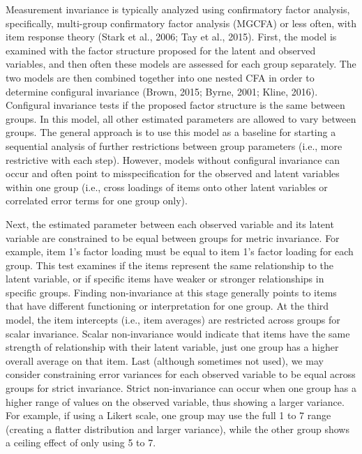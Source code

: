 \documentclass[
  man]{apa7}
\begin{document}
Measurement invariance is typically analyzed using confirmatory factor analysis, specifically, multi-group confirmatory factor analysis (MGCFA) or less often, with item response theory (Stark et al., 2006; Tay et al., 2015). First, the model is examined with the factor structure proposed for the latent and observed variables, and then often these models are assessed for each group separately. The two models are then combined together into one nested CFA in order to determine configural invariance (Brown, 2015; Byrne, 2001; Kline, 2016). Configural invariance tests if the proposed factor structure is the same between groups. In this model, all other estimated parameters are allowed to vary between groups. The general approach is to use this model as a baseline for starting a sequential analysis of further restrictions between group parameters (i.e., more restrictive with each step). However, models without configural invariance can occur and often point to misspecification for the observed and latent variables within one group (i.e., cross loadings of items onto other latent variables or correlated error terms for one group only).

Next, the estimated parameter between each observed variable and its latent variable are constrained to be equal between groups for metric invariance. For example, item 1's factor loading must be equal to item 1's factor loading for each group. This test examines if the items represent the same relationship to the latent variable, or if specific items have weaker or stronger relationships in specific groups. Finding non-invariance at this stage generally points to items that have different functioning or interpretation for one group. At the third model, the item intercepts (i.e., item averages) are restricted across groups for scalar invariance. Scalar non-invariance would indicate that items have the same strength of relationship with their latent variable, just one group has a higher overall average on that item. Last (although sometimes not used), we may consider constraining error variances for each observed variable to be equal across groups for strict invariance. Strict non-invariance can occur when one group has a higher range of values on the observed variable, thus showing a larger variance. For example, if using a Likert scale, one group may use the full 1 to 7 range (creating a flatter distribution and larger variance), while the other group shows a ceiling effect of only using 5 to 7.
\end{document}
